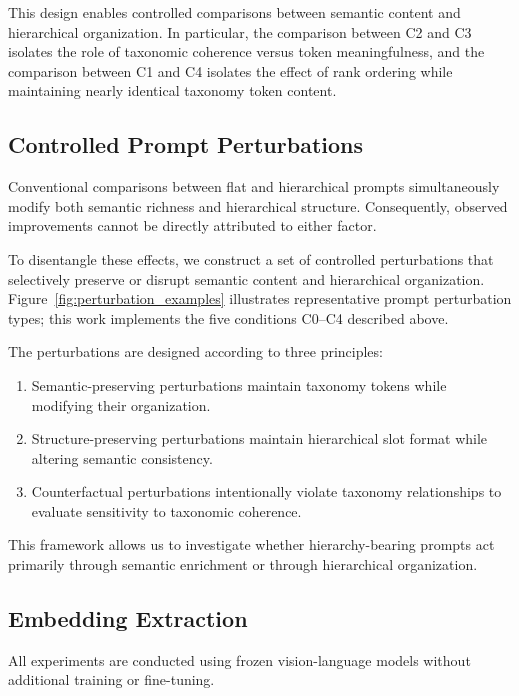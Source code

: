 This design enables controlled comparisons between semantic content and hierarchical organization. In particular, the comparison between C2 and C3 isolates the role of taxonomic coherence versus token meaningfulness, and the comparison between C1 and C4 isolates the effect of rank ordering while maintaining nearly identical taxonomy token content.

\subsection{Controlled Prompt Perturbations}

Conventional comparisons between flat and hierarchical prompts simultaneously modify both semantic richness and hierarchical structure. Consequently, observed improvements cannot be directly attributed to either factor.

To disentangle these effects, we construct a set of controlled perturbations that selectively preserve or disrupt semantic content and hierarchical organization. Figure~\ref{fig:perturbation_examples} illustrates representative prompt perturbation types; this work implements the five conditions C0--C4 described above.

The perturbations are designed according to three principles:

\begin{enumerate}
    \item Semantic-preserving perturbations maintain taxonomy tokens while modifying their organization.

    \item Structure-preserving perturbations maintain hierarchical slot format while altering semantic consistency.

    \item Counterfactual perturbations intentionally violate taxonomy relationships to evaluate sensitivity to taxonomic coherence.
\end{enumerate}

This framework allows us to investigate whether hierarchy-bearing prompts act primarily through semantic enrichment or through hierarchical organization.

\subsection{Embedding Extraction}

All experiments are conducted using frozen vision-language models without additional training or fine-tuning.

